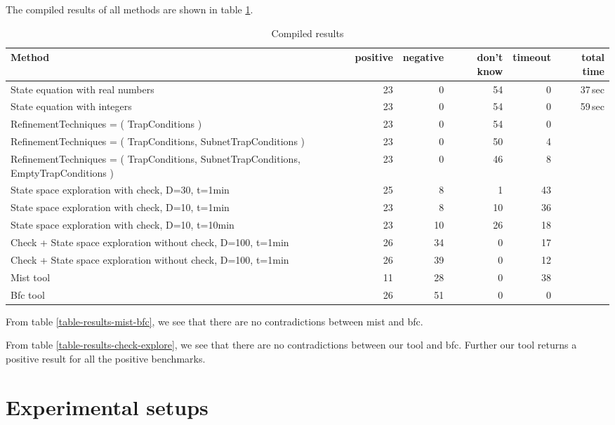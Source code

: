 \documentclass{article}
\begin{document}
The compiled results of all methods are shown in table \ref{table-results-compiled}.
\begin{table}[h]
\begin{center}
  \begin{tabular}{ | p{5cm} | r | r | r | r | r | }
    \hline
    Method & positive & negative & don't know & timeout & total time \\
    \hline
    State equation with real numbers & 23 &  0 & 54 &  0 & 37\,sec\\
    State equation with integers     & 23 &  0 & 54 &  0 & 59\,sec \\
    \hline
    RefinementTechniques = ( TrapConditions ) & 23 &  0 & 54 &  0 & \\
    RefinementTechniques = ( TrapConditions, SubnetTrapConditions ) &
    23 &  0 & 50 &  4 & \\
    RefinementTechniques = ( TrapConditions, SubnetTrapConditions, EmptyTrapConditions ) &
    23 &  0 & 46 &  8 & \\
    \hline
    State space exploration with check, D=30, t=1min  & 25 &  8 &  1 &  43 & \\
    State space exploration with check, D=10, t=1min  & 23 &  8 & 10 &  36 & \\
    State space exploration with check, D=10, t=10min & 23 & 10 & 26 &  18 & \\
    \hline
    Check + State space exploration without check, D=100, t=1min & 26 & 34 & 0 &  17 & \\
    Check + State space exploration without check, D=100, t=1min & 26 & 39 & 0 &  12 & \\
    \hline
    Mist tool & 11 & 28 & 0 & 38 & \\
    Bfc tool  & 26 & 51 & 0 &  0 & \\
    \hline
  \end{tabular}
\end{center}
\caption{Compiled results}
\label{table-results-compiled}
\end{table}

From table \ref{table-results-mist-bfc}, we see that there are no contradictions between mist and bfc.

From table \ref{table-results-check-explore}, we see that there are no contradictions between our tool and bfc. Further our tool returns a positive result for all the positive benchmarks.

\section{Experimental setups}
\end{document}
